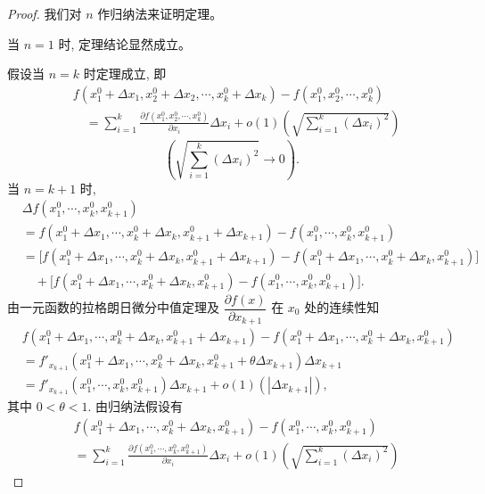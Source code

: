 \documentclass[12pt,fontset=fandol]{ctexart}
\begin{document}
\begin{proof}\quad 我们对 $n$ 作归纳法来证明定理。

当 $n=1$ 时, 定理结论显然成立。

假设当 $n=k$ 时定理成立, 即
\[
\begin{aligned}
&f(x_1^0+\Delta x_1,x_2^0+\Delta x_2,\cdots,x_k^0+\Delta x_k)
  -f(x_1^0,x_2^0,\cdots,x_k^0)\\
&\quad =
  \sum_{i=1}^k
  \frac{\partial f(x_1^0,x_2^0,\cdots,x_k^0)}{\partial x_i}\Delta x_i
  +o(1)\left(\sqrt{\sum_{i=1}^k(\Delta x_i)^2}\right)
\end{aligned}
\]
\[
  \left(\sqrt{\sum_{i=1}^k(\Delta x_i)^2}\to0\right).
\]
当 $n=k+1$ 时,
\[
\begin{aligned}
&\Delta f(x_1^0,\cdots,x_k^0,x_{k+1}^0)\\
&=f(x_1^0+\Delta x_1,\cdots,x_k^0+\Delta x_k,x_{k+1}^0+\Delta x_{k+1})
  -f(x_1^0,\cdots,x_k^0,x_{k+1}^0)\\
&=\big[f(x_1^0+\Delta x_1,\cdots,x_k^0+\Delta x_k,x_{k+1}^0+\Delta x_{k+1})
  -f(x_1^0+\Delta x_1,\cdots,x_k^0+\Delta x_k,x_{k+1}^0)\big]\\
&\quad+\big[f(x_1^0+\Delta x_1,\cdots,x_k^0+\Delta x_k,x_{k+1}^0)
  -f(x_1^0,\cdots,x_k^0,x_{k+1}^0)\big].
\end{aligned}
\]
由一元函数的拉格朗日微分中值定理及 $\dfrac{\partial f(x)}{\partial x_{k+1}}$ 在 $x_0$ 处的连续性知
\begin{equation}\label{course-eq-14-1-1}
\begin{aligned}
&f(x_1^0+\Delta x_1,\cdots,x_k^0+\Delta x_k,x_{k+1}^0+\Delta x_{k+1})
  -f(x_1^0+\Delta x_1,\cdots,x_k^0+\Delta x_k,x_{k+1}^0)\\
&=f'_{x_{k+1}}(x_1^0+\Delta x_1,\cdots,x_k^0+\Delta x_k,
  x_{k+1}^0+\theta\Delta x_{k+1})\Delta x_{k+1}\\
&=f'_{x_{k+1}}(x_1^0,\cdots,x_k^0,x_{k+1}^0)\Delta x_{k+1}
  +o(1)(|\Delta x_{k+1}|),
\end{aligned}
\end{equation}
其中 $0<\theta<1$. 由归纳法假设有
\begin{equation}\label{course-eq-14-1-2}
\begin{aligned}
&f(x_1^0+\Delta x_1,\cdots,x_k^0+\Delta x_k,x_{k+1}^0)
  -f(x_1^0,\cdots,x_k^0,x_{k+1}^0)\\
&=
\sum_{i=1}^k
\frac{\partial f(x_1^0,\cdots,x_k^0,x_{k+1}^0)}{\partial x_i}\Delta x_i
+o(1)\left(\sqrt{\sum_{i=1}^k(\Delta x_i)^2}\right)
\end{aligned}
\end{equation}

\end{proof}
\end{document}
